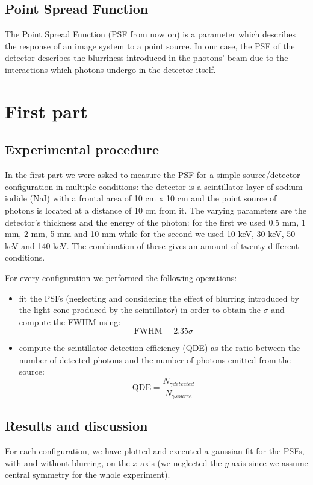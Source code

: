 \documentclass[a4paper]{article}
\begin{document}
\subsection{Point Spread Function}
The Point Spread Function (PSF from now on) is a parameter which describes the response of an image system to a point source. In our case, the PSF of the detector describes the blurriness introduced in the photons' beam due to the interactions which photons undergo in the detector itself.

\section{First part}
\subsection{Experimental procedure}
In the first part we were asked to measure the PSF for a simple source/detector configuration in multiple conditions: the detector is a scintillator layer of sodium iodide (NaI) with a frontal area of 10 cm x 10 cm and the point source of photons is located at a distance of 10 cm from it. The varying parameters are the detector's thickness and the energy of the photon: for the first we used 0.5 mm, 1 mm, 2 mm, 5 mm and 10 mm while for the second we used 10 keV, 30 keV, 50 keV and 140 keV. The combination of these gives an amount of twenty different conditions.

For every configuration we performed the following operations:
\begin{itemize}
  \item fit the PSFs (neglecting and considering the effect of blurring introduced by the light cone produced by the scintillator) in order to obtain the $\sigma$ and compute the FWHM using:
    \begin{equation}
      \text{FWHM}=2.35\sigma
      \label{eq:fwhm}
    \end{equation}
  \item compute the scintillator detection efficiency (QDE) as the ratio between the number of detected photons and the number of photons emitted from the source:
    \begin{equation}
      \text{QDE}=\frac{N_{\gamma detected}}{N_{\gamma source}}
      \label{eq:qde}
    \end{equation}
\end{itemize}

\subsection{Results and discussion}
For each configuration, we have plotted and executed a gaussian fit for the PSFs, with and without blurring, on the $x$ axis (we neglected the $y$ axis since we assume central symmetry for the whole experiment).
\end{document}
